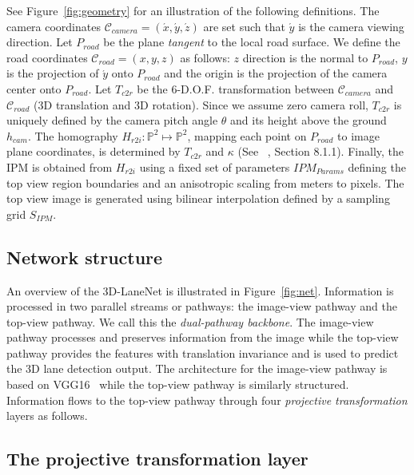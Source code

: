\documentclass[10pt,twocolumn,letterpaper]{article}
\begin{document}
See Figure~\ref{fig:geometry} for an illustration of the following definitions. The camera coordinates $\mathcal{C}_{camera}=\left(\acute{x},\acute{y},\acute{z}\right)$  are set such that $\acute{y}$ is the camera viewing direction. Let $P_{road}$ be the plane \textit{tangent} to the local road surface. We define the road coordinates $\mathcal{C}_{road}=\left(x,y,z\right)$ as follows: $z$ direction is the normal to $P_{road}$, $y$ is the projection of $\acute{y}$ onto $P_{road}$ and the origin is the projection of the camera center onto $P_{road}$. Let $T_{c2r}$ be the 6-D.O.F. transformation between $\mathcal{C}_{camera}$ and  $\mathcal{C}_{road}$ (3D translation and 3D rotation). Since we assume zero camera roll, $T_{c2r}$ is uniquely defined by the camera pitch angle $\theta$ and its height above the ground $h_{cam}$. The homography $H_{r2i}:\mathbb{P}^2\mapsto\mathbb{P}^2$, mapping each point on $P_{road}$ to image plane coordinates, is determined by $T_{c2r}$ and $\kappa$ (See ~\cite{Hartley2004}, Section 8.1.1). Finally, the IPM is obtained from $H_{r2i}$ using a fixed set of parameters $IPM_{Params}$  defining the top view region boundaries and an anisotropic scaling from meters to pixels. The top view image is generated using bilinear interpolation defined by a sampling grid $S_{IPM}$. 



\label{sec:dual_block}






\subsection{Network structure}

An overview of the 3D-LaneNet is illustrated in Figure~\ref{fig:net}. Information is processed in two parallel streams or pathways: the image-view pathway and the top-view pathway. We call this the \emph{dual-pathway backbone}. The image-view pathway processes and preserves information from the image while the top-view pathway provides the features with translation invariance and is used to predict the 3D lane detection output. The architecture for the image-view pathway is based on VGG16~\cite{VGG} while the top-view pathway is similarly structured. Information flows to the top-view pathway through four \textit{projective transformation} layers as follows. 



\subsection{The projective transformation layer}
\end{document}
